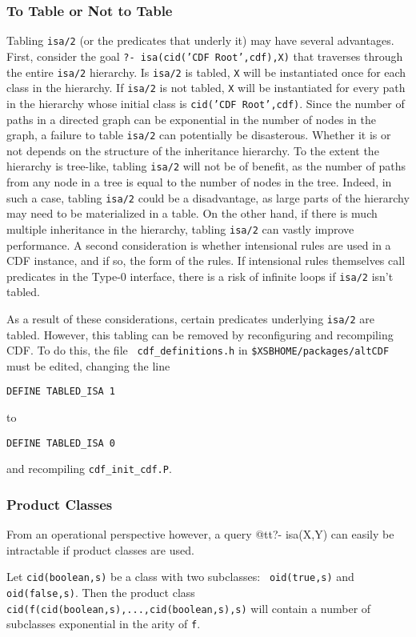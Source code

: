 \subsubsection{To Table or Not to Table}  Tabling {\tt isa/2} (or the
predicates that underly it) may have several advantages.  First,
consider the goal {\tt ?- isa(cid('CDF Root',cdf),X)} that traverses
through the entire {\tt isa/2} hierarchy.  Is {\tt isa/2} is tabled,
{\tt X} will be instantiated once for each class in the hierarchy.  If
{\tt isa/2} is not tabled, {\tt X} will be instantiated for every path
in the hierarchy whose initial class is {\tt cid('CDF Root',cdf)}.
Since the number of paths in a directed graph can be exponential in
the number of nodes in the graph, a failure to table {\tt isa/2} can
potentially be disasterous.  Whether it is or not depends on the
structure of the inheritance hierarchy.  To the extent the hierarchy
is tree-like, tabling {\tt isa/2} will not be of benefit, as the
number of paths from any node in a tree is equal to the number of
nodes in the tree.  Indeed, in such a case, tabling {\tt isa/2} could
be a disadvantage, as large parts of the hierarchy may need to be
materialized in a table.  On the other hand, if there is much multiple
inheritance in the hierarchy, tabling {\tt isa/2} can vastly improve
performance.
%
A second consideration is whether intensional rules are used in a CDF
instance, and if so, the form of the rules.  If intensional rules
themselves call predicates in the Type-0 interface, there is a risk of
infinite loops if {\tt isa/2} isn't tabled.

As a result of these considerations, certain predicates underlying
{\tt isa/2} are tabled.  However, this tabling can be removed by
reconfiguring and recompiling CDF.  To do this, the file {\tt
cdf\_definitions.h} in {\tt \$XSBHOME/packages/altCDF} must be edited,
changing the line

{\tt DEFINE TABLED\_ISA 1}

\noindent to

{\tt DEFINE TABLED\_ISA 0}

\noindent
and recompiling {\tt cdf\_init\_cdf.P}.

\subsubsection{Product Classes}
%
From an operational perspective however, a query @tt{?- isa(X,Y)} can
easily be intractable if product classes are used.

\begin{example} \rm
Let {\tt cid(boolean,s)} be a class with two subclasses: {\tt
oid(true,s)} and {\tt oid(false,s)}.  Then the product class {\tt
cid(f(cid(boolean,s),...,cid(boolean,s),s)} will contain a number of
subclasses exponential in the arity of {\tt f}.
\end{example}

